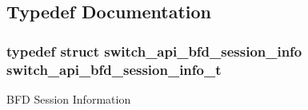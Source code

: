 \subsection{Typedef Documentation}
\hypertarget{group__BFD_gac35c149be420a6b31ae5326113a7fa31}{
\subsubsection[{switch\+\_\+api\+\_\+bfd\+\_\+session\+\_\+info\+\_\+t}]{\setlength{\rightskip}{0pt plus 5cm}typedef struct {\bf switch\+\_\+api\+\_\+bfd\+\_\+session\+\_\+info}  {\bf switch\+\_\+api\+\_\+bfd\+\_\+session\+\_\+info\+\_\+t}}}\label{group__BFD_gac35c149be420a6b31ae5326113a7fa31}
B\+F\+D Session Information 

